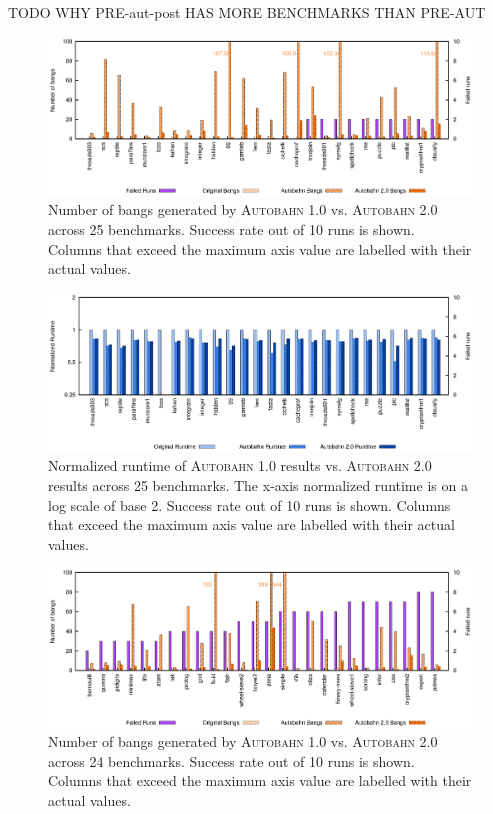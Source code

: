 \documentclass[format=sigplan, review=true]{acmart}
\newcommand{\Ao}[0]{\textsc{Autobahn 1.0}}
\newcommand{\At}[0]{\textsc{Autobahn 2.0}}
\begin{document}
TODO WHY PRE-aut-post HAS MORE BENCHMARKS THAN PRE-AUT

\begin{figure}
\includegraphics[width=\textwidth]{pap0-bangs}
\caption{Number of bangs generated by \Ao{} vs. \At{} across 25 benchmarks. Success rate out of 10 runs is shown. Columns that exceed the maximum axis value are labelled with their actual values.}
\end{figure}

\begin{figure}
\includegraphics[width=\textwidth]{pap0}
\caption{Normalized runtime of \Ao{} results vs. \At{} results across 25 benchmarks. The x-axis normalized runtime is on a log scale of base 2. Success rate out of 10 runs is shown. Columns that exceed the maximum axis value are labelled with their actual values.}
\end{figure}

\begin{figure}
\includegraphics[width=\textwidth]{pap1-bangs}
\caption{Number of bangs generated by \Ao{} vs. \At{} across 24 benchmarks. Success rate out of 10 runs is shown. Columns that exceed the maximum axis value are labelled with their actual values.}
\end{figure}
\end{document}
